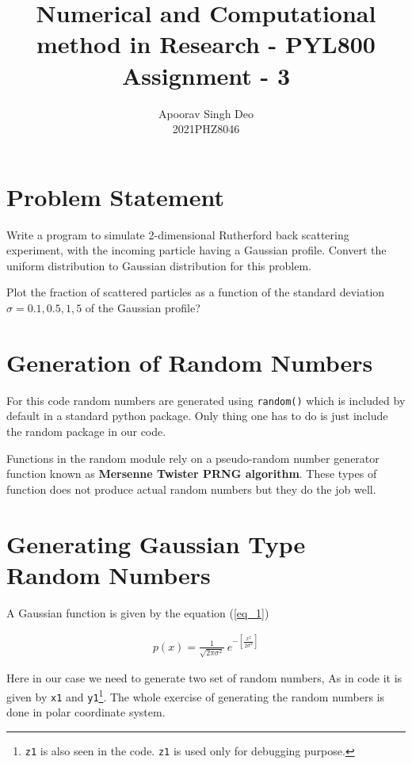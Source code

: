 \documentclass[11pt,a4paper]{article}
\begin{document}
	\title{Numerical and Computational method in Research - PYL800\\
	Assignment - 3}
	
	\author{Apoorav Singh Deo\\
	2021PHZ8046}
	\maketitle




\section{Problem Statement}
Write a program to simulate 2-dimensional Rutherford back scattering experiment, with the incoming particle having a Gaussian profile. Convert the uniform distribution to Gaussian distribution for this problem. 

Plot the fraction of scattered particles as a function of the standard deviation $\sigma = 0.1, 0.5, 1, 5$ of the Gaussian profile?

\section{Generation of Random Numbers}
For this code random numbers are generated using \texttt{random()} which is included by default in a standard python package. Only thing one has to do is just include the random package in our code.

Functions in the random module rely on a pseudo-random number generator function known as \textbf{Mersenne Twister PRNG algorithm}. These types of function does not produce actual random numbers but they do the job well.

\section{Generating Gaussian Type Random Numbers}
A Gaussian function is given by the equation (\ref{eq_1})

\begin{align}\label{eq_1}
p(x) = \frac{1}{\sqrt{2\pi\sigma^2}}\ e^{-\left[\frac{x^2}{2\sigma^2}\right]}
\end{align}

Here in our case we need to generate two set of random numbers, As in code it is given by \texttt{x1} and \texttt{y1}\footnote{\texttt{z1} is also seen in the code. \texttt{z1} is used only for debugging purpose.}. The whole exercise of generating the random numbers is done in polar coordinate system. 
\end{document}
